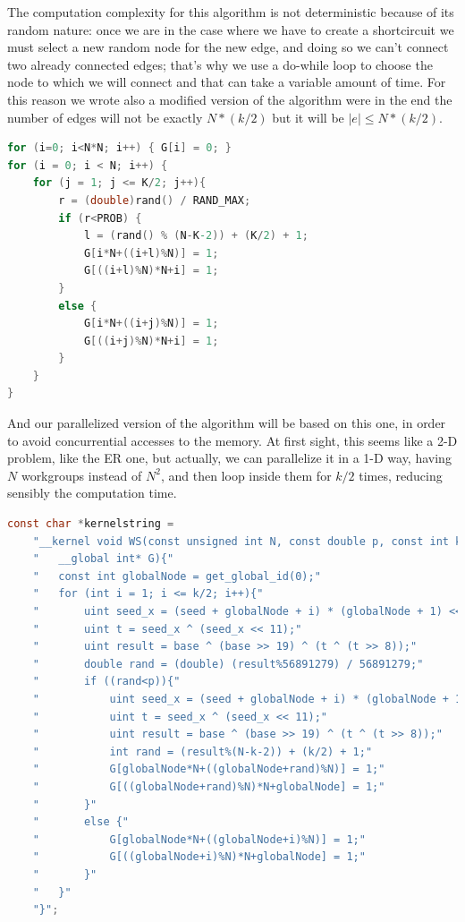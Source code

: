 \documentclass[titlepage]{article}
\begin{document}
The computation complexity for this algorithm is not deterministic because of its random nature: once we are in the case where we have to create a shortcircuit we must select a new random node for the new edge, and doing so we can't connect two already connected edges; that's why we use a do-while loop to choose the node to which we will connect and that can take a variable amount of time. For this reason we wrote also a modified version of the algorithm were in the end the number of edges will not be exactly $N*(k/2)$ but it will be $|e|\le N*(k/2)$.

\begin{minipage}{\linewidth}
\begin{lstlisting}[language=C, style=customc, breaklines=true]
for (i=0; i<N*N; i++) { G[i] = 0; }
for (i = 0; i < N; i++) {
    for (j = 1; j <= K/2; j++){
        r = (double)rand() / RAND_MAX;
        if (r<PROB) {
            l = (rand() % (N-K-2)) + (K/2) + 1;
            G[i*N+((i+l)%N)] = 1;
            G[((i+l)%N)*N+i] = 1;
        }
        else {
            G[i*N+((i+j)%N)] = 1;
            G[((i+j)%N)*N+i] = 1;
        }
    }
}
\end{lstlisting}
\end{minipage}

And our parallelized version of the algorithm will be based on this one, in order to avoid concurrential accesses to the memory. At first sight, this seems like a 2-D problem, like the ER one, but actually, we can parallelize it in a 1-D way, having $N$ workgroups instead of $N^2$, and then loop inside them for $k/2$ times, reducing sensibly the computation time.

\begin{minipage}{\linewidth}
\begin{lstlisting}[language=C, style=customc, breaklines=true]
const char *kernelstring =
    "__kernel void WS(const unsigned int N, const double p, const int k, const uint seed, const uint base,"
    "   __global int* G){"
    "   const int globalNode = get_global_id(0);"
    "   for (int i = 1; i <= k/2; i++){"
    "       uint seed_x = (seed + globalNode + i) * (globalNode + 1) << globalNode;"
    "       uint t = seed_x ^ (seed_x << 11);"
    "       uint result = base ^ (base >> 19) ^ (t ^ (t >> 8));"
    "       double rand = (double) (result%56891279) / 56891279;"
    "       if ((rand<p)){"
    "           uint seed_x = (seed + globalNode + i) * (globalNode + 1) << globalNode;"
    "           uint t = seed_x ^ (seed_x << 11);"
    "           uint result = base ^ (base >> 19) ^ (t ^ (t >> 8));"
    "           int rand = (result%(N-k-2)) + (k/2) + 1;"
    "           G[globalNode*N+((globalNode+rand)%N)] = 1;"
    "           G[((globalNode+rand)%N)*N+globalNode] = 1;"
    "       }"
    "       else {"
    "           G[globalNode*N+((globalNode+i)%N)] = 1;"
    "           G[((globalNode+i)%N)*N+globalNode] = 1;"
    "       }"
    "   }"
    "}";
\end{lstlisting}
\end{minipage}
\end{document}
